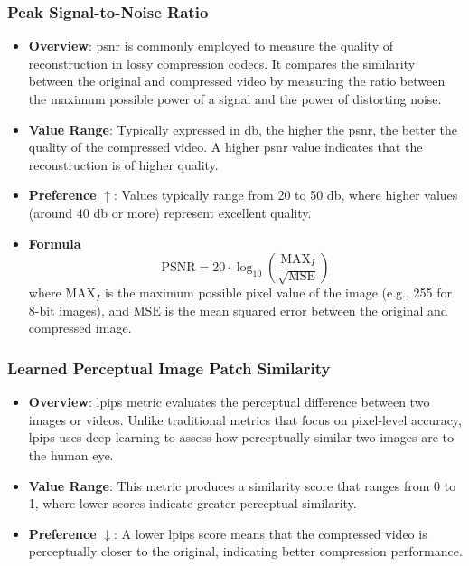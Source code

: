 \documentclass{ioereport}
\begin{document}
        \subsubsection{Peak Signal-to-Noise Ratio}
            \begin{itemize}
                \item \textbf{Overview}: \gls{psnr} is commonly employed to measure the quality of reconstruction in lossy compression \gls{codec}s. It compares the similarity between the original and compressed video by measuring the ratio between the maximum possible power of a signal and the power of distorting noise.
                \item \textbf{Value Range}: Typically expressed in \gls{db}, the higher the \gls{psnr}, the better the quality of the compressed video. A higher \gls{psnr} value indicates that the reconstruction is of higher quality.
                \item \textbf{Preference} $\uparrow$: Values typically range from 20 to 50 \gls{db}, where higher values (around 40 \gls{db} or more) represent excellent quality.
                \item \textbf{Formula} \\ 
                \begin{equation}\label{eqn:PSNR}
                    \text{PSNR} = 20 \cdot \log_{10}\left(\frac{{\text{MAX}_I}}{\sqrt{\text{MSE}}}\right)
                \end{equation}
                where $\text{MAX}_I$ is the maximum possible pixel value of the image (e.g., 255 for 8-bit images), and $\text{MSE}$ is the mean squared error between the original and compressed image.
               \end{itemize} 
           
        \subsubsection{Learned Perceptual Image Patch Similarity}
            \begin{itemize}
                \item \textbf{Overview}: \gls{lpips} metric evaluates the perceptual difference between two images or videos. Unlike traditional metrics that focus on pixel-level accuracy, \gls{lpips} uses deep learning to assess how perceptually similar two images are to the human eye.
                \item \textbf{Value Range}: This metric produces a similarity score that ranges from 0 to 1, where lower scores indicate greater perceptual similarity.
                \item \textbf{Preference} $\downarrow$: A lower \gls{lpips} score means that the compressed video is perceptually closer to the original, indicating better compression performance.
            \end{itemize}
\end{document}
